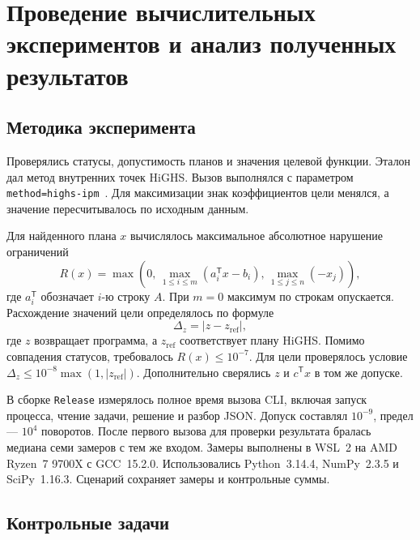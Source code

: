\section{Проведение вычислительных экспериментов и анализ полученных результатов}
\label{sec:experiments}

\subsection{Методика эксперимента}

Проверялись статусы, допустимость планов и значения целевой функции.
Эталон дал метод внутренних точек HiGHS. Вызов
 выполнялся с параметром
\texttt{method=highs-ipm}~\cite{scipyLinprog}. Для максимизации знак
коэффициентов цели менялся, а значение пересчитывалось по исходным данным.

Для найденного плана $x$ вычислялось максимальное абсолютное нарушение
ограничений
\begin{equation}
  R(x)=\max\left(0,\,
    \max_{1\le i\le m}(a_i^{\mathsf T}x-b_i),\,
    \max_{1\le j\le n}(-x_j)\right),
  \label{eq:experiment-residual}
\end{equation}
где $a_i^{\mathsf T}$ обозначает $i$-ю строку $A$. При $m=0$ максимум
по строкам опускается. Расхождение значений цели определялось по формуле
\begin{equation}
  \Delta_z=\left|z-z_{\mathrm{ref}}\right|,
  \label{eq:experiment-objective-gap}
\end{equation}
где $z$ возвращает программа, а $z_{\mathrm{ref}}$ соответствует плану
HiGHS. Помимо совпадения статусов, требовалось $R(x)\le 10^{-7}$.
Для цели проверялось условие $\Delta_z\le 10^{-8}\max(1,|z_{\mathrm{ref}}|)$.
Дополнительно сверялись $z$ и $c^{\mathsf T}x$ в том же допуске.

В сборке \texttt{Release} измерялось полное время вызова CLI, включая
запуск процесса, чтение задачи, решение и разбор JSON. Допуск составлял
$10^{-9}$, предел --- $10^4$ поворотов. После первого вызова для проверки
результата бралась медиана семи замеров с тем же входом.
Замеры выполнены в WSL~2 на AMD Ryzen~7 9700X с GCC~15.2.0.
Использовались Python~3.14.4, NumPy~2.3.5 и SciPy~1.16.3.
Сценарий  сохраняет замеры и контрольные суммы.

\subsection{Контрольные задачи}

